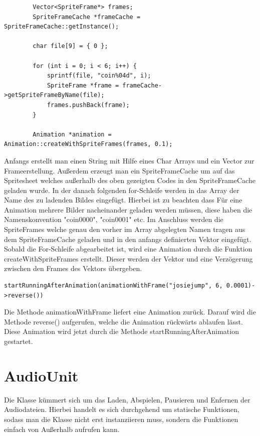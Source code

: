 \begin{lstlisting}
		Vector<SpriteFrame*> frames;
		SpriteFrameCache *frameCache = SpriteFrameCache::getInstance();

		char file[9] = { 0 };

		for (int i = 0; i < 6; i++) {
			sprintf(file, "coin%04d", i);
			SpriteFrame *frame = frameCache->getSpriteFrameByName(file);
			frames.pushBack(frame);
		}

		Animation *animation = Animation::createWithSpriteFrames(frames, 0.1);
\end{lstlisting}

Anfangs erstellt man einen String mit Hilfe eines Char Arrays und ein Vector zur Frameerstellung. Außerdem erzeugt man ein SpriteFrameCache um auf das Spritesheet welches außerhalb des oben gezeigten Codes in den SpriteFrameCache geladen wurde. In der danach folgenden for-Schleife werden
in das Array der Name des zu ladenden Bildes eingefügt. Hierbei ist zu beachten dass Für eine Animation mehrere Bilder nacheinander geladen werden müssen, diese haben die Namenskonvention "coin0000", "coin0001" etc. Im Anschluss werden die SpriteFrames welche genau den vorher im Array abgelegten Namen tragen aus dem SpriteFrameCache geladen und in den anfangs definierten Vektor eingefügt. 
Sobald die For-Schleife abgearbeitet ist, wird eine Animation durch die Funktion createWithSpriteFrames erstellt. Dieser werden der Vektor und eine Verzögerung zwischen den Frames des Vektors übergeben.

\begin{lstlisting}
startRunningAfterAnimation(animationWithFrame("josiejump", 6, 0.0001)->reverse())
\end{lstlisting}

Die Methode animationWithFrame liefert eine Animation zurück. Darauf wird die Methode reverse() aufgerufen, welche die Animation rückwärts ablaufen lässt. Diese Animation wird jetzt durch die Methode startRunningAfterAnimation gestartet. 


\section{AudioUnit}\label{sec:4_Audiounit}
Die Klasse  kümmert sich um das Laden, Abspielen, Pausieren und Enfernen der Audiodateien. Hierbei handelt es sich durchgehend um statische Funktionen, sodass man die Klasse nicht erst instanziieren muss, sondern die Funktionen einfach von Außerhalb aufrufen kann.

